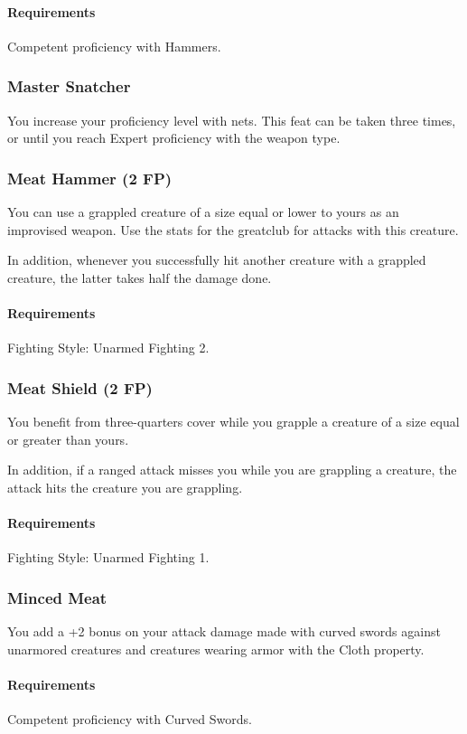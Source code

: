     \paragraph{Requirements} Competent proficiency with Hammers.
\subsubsection{Master Snatcher} \label{feat::snatcher}
    You increase your proficiency level with nets.
    This feat can be taken three times, or until you reach Expert proficiency with the weapon type.
\subsubsection{Meat Hammer (2 FP)} \label{feat::meathammer}
    You can use a grappled creature of a size equal or lower to yours as an improvised weapon.
    Use the stats for the greatclub for attacks with this creature.

    In addition, whenever you successfully hit another creature with a grappled creature, the latter takes half the damage done.
    \paragraph{Requirements} Fighting Style: Unarmed Fighting 2.
\subsubsection{Meat Shield (2 FP)} \label{feat::meatshield}
    You benefit from three-quarters cover while you grapple a creature of a size equal or greater than yours.

    In addition, if a ranged attack misses you while you are grappling a creature, the attack hits the creature you are grappling.
    \paragraph{Requirements} Fighting Style: Unarmed Fighting 1.
\subsubsection{Minced Meat} \label{feat::mincedmeat}
    You add a +2 bonus on your attack damage made with curved swords against unarmored creatures and creatures wearing armor with the Cloth property.
    \paragraph{Requirements} Competent proficiency with Curved Swords.
